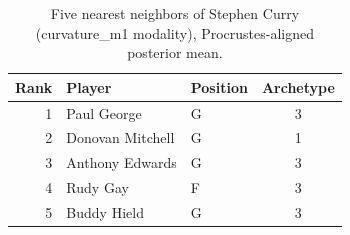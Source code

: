 \begin{table}[htbp]
  \centering\small
  \begin{tabular}{rllc}
    \toprule
    Rank & Player & Position & Archetype \\
    \midrule
    1 & Paul George & G & 3 \\
    2 & Donovan Mitchell & G & 1 \\
    3 & Anthony Edwards & G & 3 \\
    4 & Rudy Gay & F & 3 \\
    5 & Buddy Hield & G & 3 \\
    \bottomrule
  \end{tabular}
  \caption{Five nearest neighbors of Stephen Curry (curvature_m1 modality), Procrustes-aligned posterior mean.}
  \label{tab:Stephen_Curry_neighbors_curvature_m1}
\end{table}

